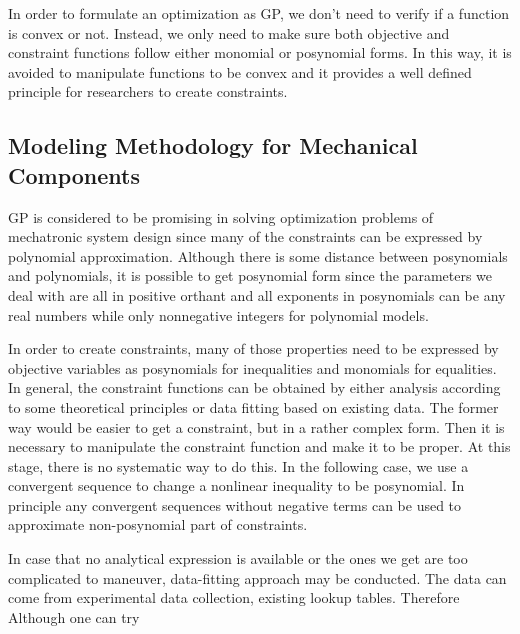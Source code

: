 In order to formulate an optimization as GP, we don't need to verify if a function is convex or not. Instead, we only need to make sure both objective and constraint functions follow either monomial or posynomial forms. In this way, it is avoided to manipulate functions to be convex and it provides a well defined principle for researchers to create constraints.

\subsection{Modeling Methodology for Mechanical Components}
GP is considered to be promising in solving optimization problems of mechatronic system design since many of the constraints can be expressed by polynomial approximation. Although there is some distance between posynomials and polynomials, it is possible to get posynomial form since the parameters we deal with are all in positive orthant and all exponents in posynomials can be any real numbers while only nonnegative integers for polynomial models. 

In order to create constraints, many of those properties need to be expressed by objective variables as posynomials for inequalities and monomials for equalities. In general, the constraint functions can be obtained by either analysis according to some theoretical principles or data fitting based on existing data. The former way would be easier to get a constraint, but in a rather complex form. Then it is necessary to manipulate the constraint function and make it to be proper. At this stage, there is no systematic way to do this. In the following case, we use a convergent sequence to change a nonlinear inequality to be posynomial. In principle any convergent sequences without negative terms can be used to approximate non-posynomial part of constraints. 
 
 
In case that no analytical expression is available or the ones we get are too complicated to maneuver, data-fitting approach may be conducted. The data can come from experimental data collection, existing lookup tables. Therefore 
Although one can try 
 